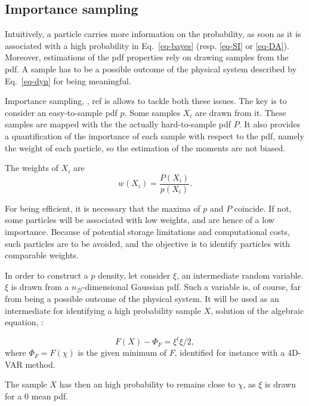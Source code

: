 \documentclass[aip,pof,nofootinbib,reprint,onecolumn]{revtex4-1}
\newcommand{\todo}[1]{{\color{red} #1 }}
\newcommand{\mypar}[1]{\left(#1\right)}
\newcommand{\Nphaz}{n_{\mathcal{D}}} %
\newcommand{\rpoint}{X}
\begin{document}
\subsection{Importance sampling}

Intuitively, a particle carries more information on the probability, as soon as it is associated with a high probability in Eq.~\eqref{eq-bayes} (resp. \eqref{eq-SI} or \eqref{eq-DA}).
Moreover, estimations of the pdf properties rely on drawing samples from the pdf. 
A sample has to be a possible outcome of the physical system described by Eq.~\eqref{eq-dyn} for being meaningful.

Importance sampling, \citep{Chorin2010,Morzfeld2012}, \todo{ref is} allows to tackle both these issues.
The key is to consider an easy-to-sample pdf $p$. Some samples $\rpoint_i$ are drawn from it. These samples are mapped with the the actually hard-to-sample pdf $P$.
It also provides a quantification of the importance of each sample with respect to the pdf, namely the weight of each particle, so the estimation of the moments are not biased.

The weights of $\rpoint_i$ are
\begin{equation}
w\mypar{\rpoint_i} = \frac{P\mypar{\rpoint_i}}{p\mypar{\rpoint_i}}.
\label{eq-weight}
\end{equation}

For being efficient, it is necessary that the maxima of $p$ and $P$ coincide. If not, some particles will be associated with low weights, and are hence of a low importance. Because of potential storage limitations and computational costs, such particles are to be avoided, and the objective is to identify particles with comparable weights.


In order to construct a $p$ density, let consider $\xi$, an intermediate
random variable. $\xi$ is drawn from a $\Nphaz$-dimensional Gaussian pdf.
Such a variable is, of course, far from being a possible outcome of the
physical system. It will be used as an intermediate for identifying a high
probability sample $\rpoint$, solution of the algebraic equation,
\cite{Morzfeld2012}:

\begin{equation}
F\mypar{\rpoint} - \Phi_F = \xi^t\xi/2,
\label{eq-alg}
\end{equation}
where $\Phi_F = F\mypar{\chi}$ is the given minimum of $F$, identified for instance with a 4D-VAR method.

The sample $X$ has then an high probability to remains close to $\chi$, as $\xi$ is drawn for a $0$ mean pdf. 
\end{document}
